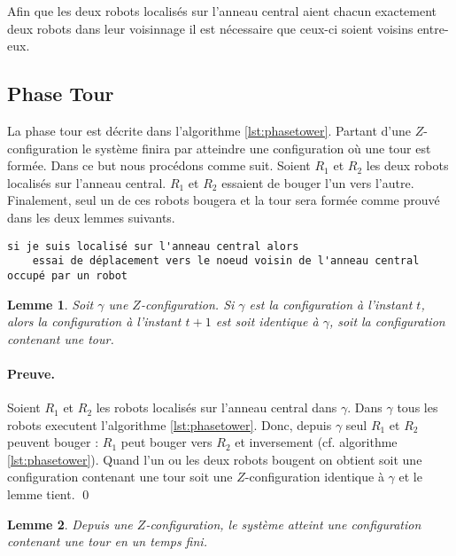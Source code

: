 \documentclass{article}
\newtheorem{lemme}{Lemme}
\begin{document}
      Afin que les deux robots localisés sur l'anneau central aient chacun
      exactement deux robots dans leur voisinnage il est nécessaire que ceux-ci
      soient voisins entre-eux.

    \subsection{Phase Tour}

      La phase tour est décrite dans l'algorithme \ref{lst:phasetower}. Partant
      d'une $Z$-configuration le système finira par atteindre une configuration
      où une tour est formée. Dans ce but nous procédons comme suit. Soient
      $R_1$ et $R_2$ les deux robots localisés sur l'anneau central. $R_1$ et
      $R_2$ essaient de bouger l'un vers l'autre. Finalement, seul un de ces
      robots bougera et la tour sera formée comme prouvé dans les deux lemmes
      suivants.

\begin{lstlisting}[label=lst:phasetower]
  si je suis localisé sur l'anneau central alors
    essai de déplacement vers le noeud voisin de l'anneau central occupé par un robot
\end{lstlisting}

      \begin{lemme}\label{lem:tower}
        Soit $\gamma$ une $Z$-configuration. Si $\gamma$ est la configuration à
        l'instant $t$, alors la configuration à l'instant $t + 1$ est soit
        identique à $\gamma$, soit la configuration contenant une tour.
      \end{lemme}

      \paragraph{Preuve.} Soient $R_1$ et $R_2$ les robots localisés sur l'anneau
        central dans $\gamma$. Dans $\gamma$ tous les robots executent
        l'algorithme \ref{lst:phasetower}. Donc, depuis $\gamma$ seul $R_1$ et
        $R_2$ peuvent bouger : $R_1$ peut bouger vers $R_2$ et inversement
        (cf. algorithme \ref{lst:phasetower}). Quand l'un ou les deux robots
        bougent on obtient soit une configuration contenant une tour soit une
        $Z$-configuration identique à $\gamma$ et le lemme tient. \qed

      \begin{lemme}
        Depuis une $Z$-configuration, le système atteint une configuration
        contenant une tour en un temps fini.
      \end{lemme}
\end{document}
